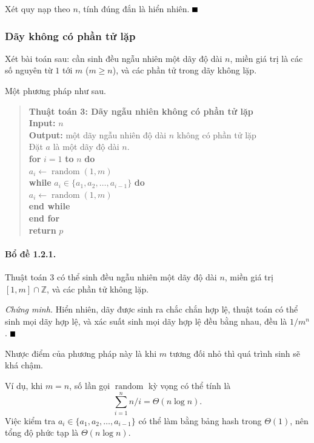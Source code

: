 \documentclass[11pt]{article}
\providecommand{\square}{\mathord{\vcenter{\hrule height .6em width .6em}}}
\begin{document}
Xét quy nạp theo $n$, tính đúng đắn là hiển nhiên. \hfill$\square$

\subsubsection{Dãy không có phần tử lặp}

Xét bài toán sau: cần sinh đều ngẫu nhiên một dãy độ dài $n$, miền giá trị là
các số nguyên từ $1$ tới $m$ ($m\ge n$), và các phần tử trong dãy không lặp.

Một phương pháp như sau.

\begin{quote}
\textbf{Thuật toán 3: Dãy ngẫu nhiên không có phần tử lặp}\\
\textbf{Input:} $n$\\
\textbf{Output:} một dãy ngẫu nhiên độ dài $n$ không có phần tử lặp\\
Đặt $a$ là một dãy độ dài $n$.\\
\textbf{for} $i=1$ \textbf{to} $n$ \textbf{do}\\
\hspace*{1.5em}$a_i\leftarrow \operatorname{random}(1,m)$\\
\hspace*{1.5em}\textbf{while} $a_i\in\{a_1,a_2,\ldots,a_{i-1}\}$ \textbf{do}\\
\hspace*{3em}$a_i\leftarrow \operatorname{random}(1,m)$\\
\hspace*{1.5em}\textbf{end while}\\
\textbf{end for}\\
\textbf{return} $p$
\end{quote}

\paragraph{Bổ đề 1.2.1.}
Thuật toán 3 có thể sinh đều ngẫu nhiên một dãy độ dài $n$, miền giá trị
$[1,m]\cap\mathbb{Z}$, và các phần tử không lặp.

\emph{Chứng minh.}
Hiển nhiên, dãy được sinh ra chắc chắn hợp lệ, thuật toán có thể sinh mọi dãy
hợp lệ, và xác suất sinh mọi dãy hợp lệ đều bằng nhau, đều là $1/m^n$.
\hfill$\square$

Nhược điểm của phương pháp này là khi $m$ tương đối nhỏ thì quá trình sinh sẽ
khá chậm.

Ví dụ, khi $m=n$, số lần gọi $\operatorname{random}$ kỳ vọng có thể tính là
\[
\sum_{i=1}^n n/i=\Theta(n\log n).
\]
Việc kiểm tra $a_i\in\{a_1,a_2,\ldots,a_{i-1}\}$ có thể làm bằng bảng hash trong
$\Theta(1)$, nên tổng độ phức tạp là $\Theta(n\log n)$.
\end{document}
